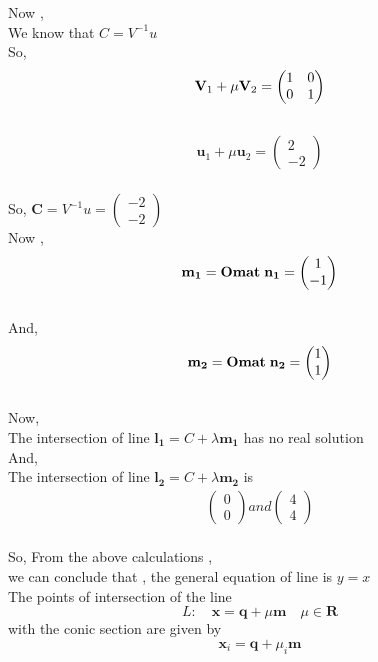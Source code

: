 \documentclass[journal,12pt,twocolumn]{IEEEtran}
\newcommand{\myvec}[1]{\ensuremath{\begin{pmatrix}#1\end{pmatrix}}}
\let\vec\mathbf
\let\vec\mathbf
\begin{document}
Now ,\\
We know that $C = V^{-1} u $\\
So, 
\begin{align}
\vec{V}_1+\mu\vec{V}_2= \myvec{
1 & 0\\
0 & \-1
}
\end{align}
\\
\begin{align}
\vec{u}_1+\mu\vec{u}_2= \myvec{
2\\
-2
}
\end{align}
\\
So, $\vec{C} = V^{-1} u = \myvec{-2 \\ -2} $
\\
Now ,\\
\begin{align}
\vec{m_1}= {\vec{Omat} } \hspace{1mm} \vec{n_1} = \myvec{1\\ -1}
\end{align}
\\
And,\\
\begin{align}
\vec{m_2}= {\vec{Omat} } \hspace{1mm} \vec{n_2} = \myvec{1\\ 1}
\end{align}
\\
Now,\\
The intersection of line $\vec{l_1}= C + \lambda \vec{m_1}$ has no real solution \\
And,\\
The intersection of line $\vec{l_2}= C + \lambda \vec{m_2}$ is \\
\begin{align}
\myvec{ 0\\0} and \myvec{4 \\4}
\end{align}
\\
So, From the above calculations ,\\
 we can conclude that , the general equation of line is $y=x$\\
 \newpage
The points of intersection of the line 
\begin{equation}
 L: \quad \vec{x} = \vec{q} + \mu \vec{m} \quad \mu \in \mathbf{R}
\label{eq:conic_tangent}
\end{equation}
with the conic section are given by
\begin{equation}
\vec{x}_i = \vec{q} + \mu_i \vec{m}
\label{eq-32-} 
\end{equation}
\end{document}
